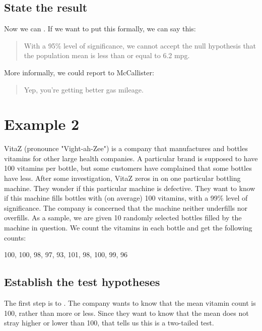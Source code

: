 \documentclass[../../../main.tex]{subfiles}
\begin{document}
\subsection{State the result}

Now we can . If we want to put this formally, we can say this:

\begin{quote}
  With a 95\% level of significance, we cannot accept the null hypothesis that the population mean is less than or equal to 6.2 mpg.
\end{quote}

\noindent
More informally, we could report to McCallister:

\begin{quote}
  Yep, you're getting better gas mileage.
\end{quote}



\section{Example 2}

VitaZ (pronounce "Vight-ah-Zee") is a company that manufactures and bottles vitamins for other large health companies. A particular brand is supposed to have 100 vitamins per bottle, but some customers have complained that some bottles have less. After some investigation, VitaZ zeros in on one particular bottling machine. They wonder if this particular machine is defective. They want to know if this machine fills bottles with (on average) 100 vitamins, with a 99\% level of significance. The company is concerned that the machine neither underfills nor overfills. As a sample, we are given 10 randomly selected bottles filled by the machine in question. We count the vitamins in each bottle and get the following counts:

\begin{center}
  100, 100, 98, 97, 93, 101, 98, 100, 99, 96
\end{center}


\subsection{Establish the test hypotheses}

The first step is to . The company wants to know that the mean vitamin count is 100, rather than more or less. Since they want to know that the mean does not stray higher or lower than 100, that tells us this is a two-tailed test.
\end{document}
